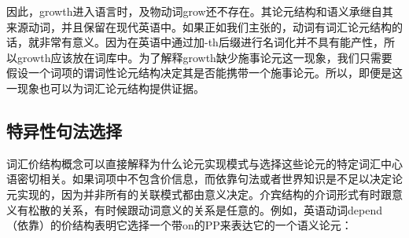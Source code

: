 \begin{exe}
\begin{xlist}[iv.]
\begin{exe}
\begin{xlist}[iv.]
\noindent
因此，growth进入语言时，及物动词grow还不存在。其论元结构和语义承继自其来源动词，并且保留在现代英语中。如果正如我们主张的，动词有词汇论元结构的话，就非常有意义。因为在英语中通过加-th后缀进行名词化并不具有能产性，所以growth应该放在词库中。为了解释growth缺少施事论元这一现象，我们只需要假设一个词项的谓词性论元结构决定其是否能携带一个施事论元。所以，即便是这一现象也可以为词汇论元结构提供证据。

\subsection{特异性句法选择}
\label{sec-idiosyncratic-case-and-PP}


词汇价结构概念可以直接解释为什么论元实现模式与选择这些论元的特定词汇中心语密切相关。如果词项中不包含价信息，而依靠句法或者世界知识是不足以决定论元实现的，因为并非所有的关联模式都由意义决定。介宾结构的介词形式有时跟意义有松散的关系，有时候跟动词意义的关系是任意的。例如，英语动词depend（依靠）的价结构表明它选择一个带on的PP来表达它的一个语义论元：


\end{xlist}
\end{exe}
\end{xlist}
\end{exe}
